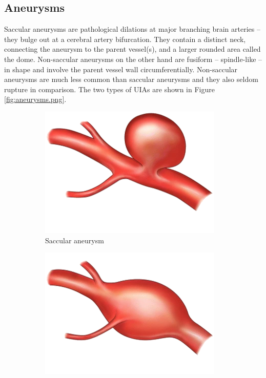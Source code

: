 \subsection{Aneurysms}
Saccular aneurysms are pathological dilations at major branching brain arteries -- they bulge out at a cerebral artery bifurcation. They contain a distinct neck, connecting the aneurysm to the parent vessel(s), and a larger rounded area called the dome. Non-saccular aneurysms on the other hand are fusiform -- spindle-like -- in shape and involve the parent vessel wall circumferentially. Non-saccular aneurysms are much less common than saccular aneurysms and they also seldom rupture in comparison. The two types of UIAs are shown in Figure \ref{fig:aneurysms.png}.

\begin{figure}[h]
	\centering
	\begin{subfigure}{.45\linewidth}
		\includegraphics[width=\linewidth]{figures/saccular.png}
		\caption[Saccular aneurysm]{Saccular aneurysm}
	\end{subfigure}
	\begin{subfigure}{.45\linewidth}
		\includegraphics[width=\linewidth]{figures/fusiform.png}

\end{subfigure}
\end{figure}
